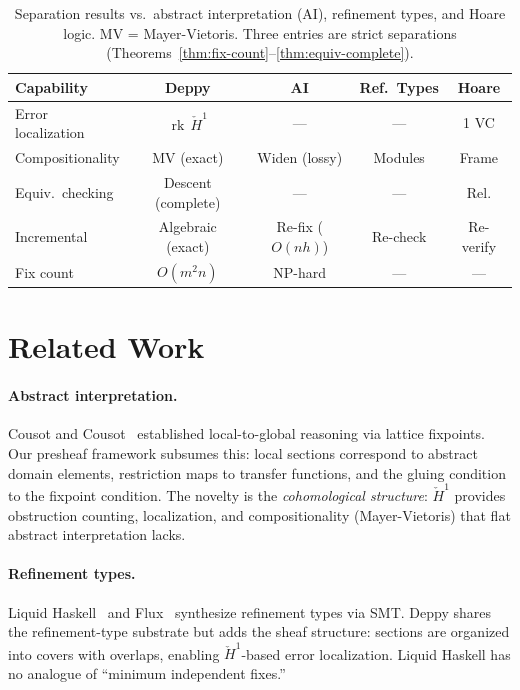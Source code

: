 \documentclass[acmsmall,screen]{acmart}
\theoremstyle{remark}
\newcommand{\Hc}[1]{\check{H}^{#1}}
\newcommand{\rk}{\operatorname{rk}}
\begin{document}
\begin{table}[t]
\centering\small
\begin{tabular}{lcccc}
\toprule
\textbf{Capability} & \textbf{Deppy} & \textbf{AI} & \textbf{Ref.\ Types} & \textbf{Hoare} \\
\midrule
Error localization & $\rk\,\Hc{1}$ & --- & --- & 1 VC \\
Compositionality & MV (exact) & Widen (lossy) & Modules & Frame \\
Equiv.\ checking & Descent (complete) & --- & --- & Rel. \\
Incremental & Algebraic (exact) & Re-fix ($O(nh)$) & Re-check & Re-verify \\
Fix count & $O(m^2 n)$ & NP-hard & --- & --- \\
\bottomrule
\end{tabular}
\caption{Separation results vs.\ abstract interpretation (AI),
refinement types, and Hoare logic.  MV = Mayer-Vietoris.
Three entries are strict separations (Theorems~\ref{thm:fix-count}--\ref{thm:equiv-complete}).}
\label{tab:comparison}
\end{table}

\section{Related Work}\label{sec:related}

\paragraph{Abstract interpretation.}
Cousot and Cousot~\cite{CousotCousot77} established local-to-global
reasoning via lattice fixpoints.  Our presheaf framework subsumes this:
local sections correspond to abstract domain elements, restriction maps
to transfer functions, and the gluing condition to the fixpoint
condition.  The novelty is the \emph{cohomological structure}: $\Hc{1}$
provides obstruction counting, localization, and compositionality
(Mayer-Vietoris) that flat abstract interpretation lacks.

\paragraph{Refinement types.}
Liquid Haskell~\cite{VazouSeidel14} and Flux~\cite{Flux} synthesize
refinement types via SMT.  Deppy shares the refinement-type substrate
but adds the sheaf structure: sections are organized into covers with
overlaps, enabling $\Hc{1}$-based error localization.  Liquid Haskell
has no analogue of ``minimum independent fixes.''
\end{document}

